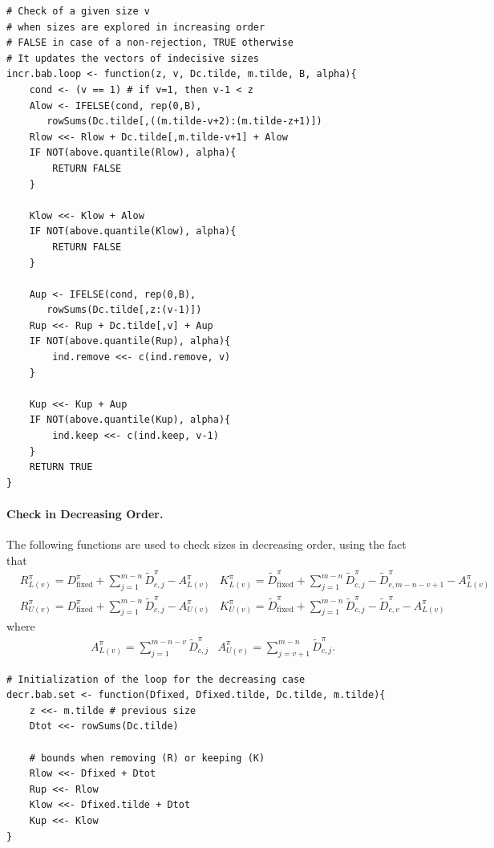 \documentclass[11pt,a4paper,openright,twoside]{article}
\begin{document}
\begin{lstlisting}
# Check of a given size v
# when sizes are explored in increasing order
# FALSE in case of a non-rejection, TRUE otherwise
# It updates the vectors of indecisive sizes
incr.bab.loop <- function(z, v, Dc.tilde, m.tilde, B, alpha){
	cond <- (v == 1) # if v=1, then v-1 < z
	Alow <- IFELSE(cond, rep(0,B),
	   rowSums(Dc.tilde[,((m.tilde-v+2):(m.tilde-z+1)])
	Rlow <<- Rlow + Dc.tilde[,m.tilde-v+1] + Alow
	IF NOT(above.quantile(Rlow), alpha){
		RETURN FALSE
	}

	Klow <<- Klow + Alow
	IF NOT(above.quantile(Klow), alpha){
		RETURN FALSE
	}

	Aup <- IFELSE(cond, rep(0,B),
	   rowSums(Dc.tilde[,z:(v-1)])
	Rup <<- Rup + Dc.tilde[,v] + Aup
	IF NOT(above.quantile(Rup), alpha){
		ind.remove <<- c(ind.remove, v)
	}

	Kup <<- Kup + Aup
	IF NOT(above.quantile(Kup), alpha){
		ind.keep <<- c(ind.keep, v-1)
	}
	RETURN TRUE
}
\end{lstlisting}




\vspace{3mm}
\paragraph{Check in Decreasing Order.} The following functions are used to check sizes in decreasing order, using the fact that
\begin{align*}
&R_{L(v)}^{\pi}=D_{\text{fixed}}^{\pi}+\sum_{j=1}^{m-n}\tilde{D}_{c,j}^{\pi} - A_{L(v)}^{\pi} & K_{L(v)}^{\pi}=\tilde{D}_{\text{fixed}}^{\pi}+\sum_{j=1}^{m-n}\tilde{D}_{c,j}^{\pi} - \tilde{D}_{c,m-n-v+1}^{\pi} - A_{L(v)}^{\pi}\\
&R_{U(v)}^{\pi}=D_{\text{fixed}}^{\pi}+\sum_{j=1}^{m-n}\tilde{D}_{c,j}^{\pi} -A_{U(v)}^{\pi} & K_{U(v)}^{\pi}=\tilde{D}_{\text{fixed}}^{\pi}+\sum_{j=1}^{m-n}\tilde{D}_{c,j}^{\pi} - \tilde{D}_{c,v}^{\pi} - A_{L(v)}^{\pi}
\end{align*}
where
\begin{align*}
& A_{L(v)}^{\pi}=\sum_{j=1}^{m-n-v} \tilde{D}_{c,j}^{\pi} & A_{U(v)}^{\pi}=\sum_{j=v+1}^{m-n}  \tilde{D}_{c,j}^{\pi}.
\end{align*}

\begin{lstlisting}
# Initialization of the loop for the decreasing case
decr.bab.set <- function(Dfixed, Dfixed.tilde, Dc.tilde, m.tilde){
	z <<- m.tilde # previous size
	Dtot <<- rowSums(Dc.tilde)

	# bounds when removing (R) or keeping (K)
	Rlow <<- Dfixed + Dtot
	Rup <<- Rlow
	Klow <<- Dfixed.tilde + Dtot
	Kup <<- Klow
}
\end{lstlisting}
\end{document}
